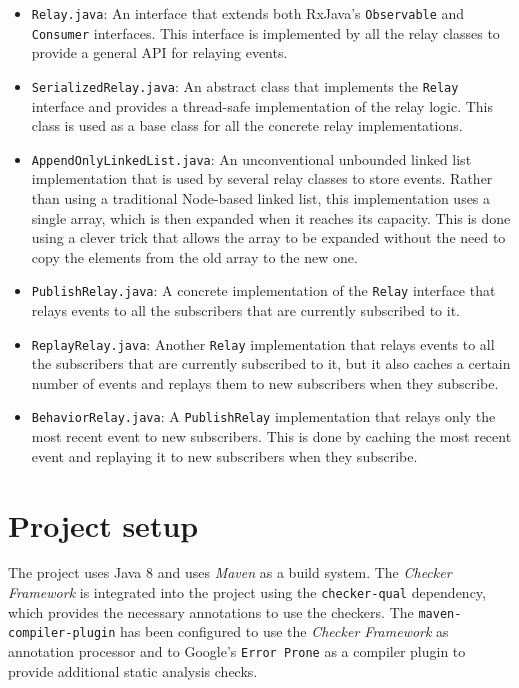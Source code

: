 \documentclass[a4paper, 11pt]{article}
\begin{document}
\begin{itemize}
	\item \texttt{Relay.java}: An interface that extends both RxJava's \texttt{Observable} and \texttt{Consumer} interfaces. This interface is implemented by all the relay classes to provide a general API for relaying events.

	\item \texttt{SerializedRelay.java}: An abstract class that implements the \texttt{Relay} interface and provides a thread-safe implementation of the relay logic. This class is used as a base class for all the concrete relay implementations.


	\item \texttt{AppendOnlyLinkedList.java}: An unconventional unbounded linked list implementation that is used by several relay classes to store events. Rather than using a traditional Node-based linked list, this implementation uses a single array, which is then expanded when it reaches its capacity. This is done using a clever trick that allows the array to be expanded without the need to copy the elements from the old array to the new one.

	\item \texttt{PublishRelay.java}: A concrete implementation of the \texttt{Relay} interface that relays events to all the subscribers that are currently subscribed to it.

	\item \texttt{ReplayRelay.java}: Another \texttt{Relay} implementation that relays events to all the subscribers that are currently subscribed to it, but it also caches a certain number of events and replays them to new subscribers when they subscribe.

	\item \texttt{BehaviorRelay.java}: A \texttt{PublishRelay} implementation that relays only the most recent event to new subscribers. This is done by caching the most recent event and replaying it to new subscribers when they subscribe.
\end{itemize}

\pagebreak

\section{Project setup}

The project uses Java 8 and uses \textit{Maven} as a build system. The \textit{Checker Framework} is integrated into the project using the \texttt{checker-qual} dependency, which provides the necessary annotations to use the checkers. The \texttt{maven-compiler-plugin} has been configured to use the \textit{Checker Framework} as annotation processor and to Google's \texttt{Error Prone} as a compiler plugin to provide additional static analysis checks.
\end{document}

